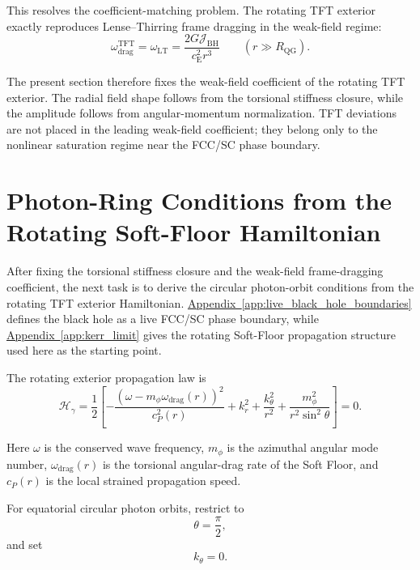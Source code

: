 This resolves the coefficient-matching problem. The rotating TFT exterior exactly reproduces Lense--Thirring frame dragging in the weak-field regime:
\begin{equation}
    \boxed{ \omega_{\mathrm{drag}}^{\mathrm{TFT}} = \omega_{\mathrm{LT}} = \frac{2G\mathcal{J}_{\mathrm{BH}}}{c_{\mathrm{E}}^2r^3} \qquad (r \gg R_{\mathrm{QG}}). }
\end{equation}

The present section therefore fixes the weak-field coefficient of the rotating TFT exterior. The radial field shape follows from the torsional stiffness closure, while the amplitude follows from angular-momentum normalization. TFT deviations are not placed in the leading weak-field coefficient; they belong only to the nonlinear saturation regime near the FCC/SC phase boundary.

\section{Photon-Ring Conditions from the Rotating Soft-Floor Hamiltonian}

After fixing the torsional stiffness closure and the weak-field frame-dragging coefficient, the next task is to derive the circular photon-orbit conditions from the rotating TFT exterior Hamiltonian. \hyperref[app:live_black_hole_boundaries]{Appendix~\ref*{app:live_black_hole_boundaries}} defines the black hole as a live FCC/SC phase boundary, while \hyperref[app:kerr_limit]{Appendix~\ref*{app:kerr_limit}} gives the rotating Soft-Floor propagation structure used here as the starting point. 

The rotating exterior propagation law is
\begin{equation}
    \mathcal{H}_{\gamma} = \frac{1}{2} \left[ - \frac{\left(\omega - m_{\phi}\omega_{\mathrm{drag}}(r)\right)^2}{c_P^2(r)} + k_r^2 + \frac{k_{\theta}^2}{r^2} + \frac{m_{\phi}^2}{r^2\sin^2\theta} \right] = 0.
\end{equation}

Here $\omega$ is the conserved wave frequency, $m_{\phi}$ is the azimuthal angular mode number, $\omega_{\mathrm{drag}}(r)$ is the torsional angular-drag rate of the Soft Floor, and $c_P(r)$ is the local strained propagation speed.

For equatorial circular photon orbits, restrict to
\begin{equation}
    \theta = \frac{\pi}{2},
\end{equation}
and set
\begin{equation}
    k_{\theta} = 0.
\end{equation}

